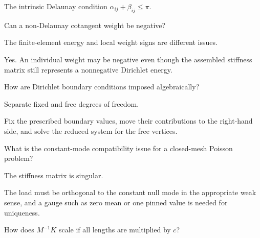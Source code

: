 \begin{solution}
The intrinsic Delaunay condition \(\alpha_{ij}+\beta_{ij}\le\pi\).
\end{solution}

\begin{exercise}\label{exr:vii41-19}
Can a non-Delaunay cotangent weight be negative?
\end{exercise}

\begin{hint}
The finite-element energy and local weight signs are different issues.
\end{hint}

\begin{solution}
Yes.  An individual weight may be negative even though the assembled stiffness matrix still represents a nonnegative Dirichlet energy.
\end{solution}

\begin{exercise}\label{exr:vii41-20}
How are Dirichlet boundary conditions imposed algebraically?
\end{exercise}

\begin{hint}
Separate fixed and free degrees of freedom.
\end{hint}

\begin{solution}
Fix the prescribed boundary values, move their contributions to the right-hand side, and solve the reduced system for the free vertices.
\end{solution}

\begin{exercise}\label{exr:vii41-21}
What is the constant-mode compatibility issue for a closed-mesh Poisson problem?
\end{exercise}

\begin{hint}
The stiffness matrix is singular.
\end{hint}

\begin{solution}
The load must be orthogonal to the constant null mode in the appropriate weak sense, and a gauge such as zero mean or one pinned value is needed for uniqueness.
\end{solution}

\begin{exercise}\label{exr:vii41-22}
How does \(M^{-1}K\) scale if all lengths are multiplied by \(c\)?
\end{exercise}

